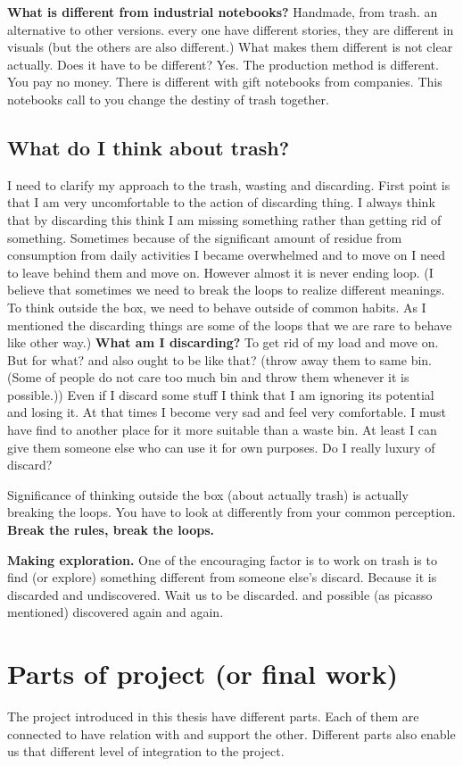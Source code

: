 \textbf{What is different from industrial notebooks?} Handmade, from trash. an alternative to other versions. every one have different stories, they are different in visuals (but the others are also different.) What makes them different is not clear actually. Does it have to be different? Yes. The production method is different. You pay no money. There is different with gift notebooks from companies. This notebooks call to you change the destiny of trash together. 

\subsection{What do I think about trash?}
I need to clarify my approach to the trash, wasting and discarding. First point is that I am very uncomfortable to the action of discarding thing. I always think that by discarding this think I am missing something rather than getting rid of something. Sometimes because of the significant amount of residue from consumption from daily activities I became overwhelmed and to move on I need to leave behind them and move on. However almost it is never ending loop. (I believe that sometimes we need to break the loops to realize different meanings. To think outside the box, we need to behave outside of common habits. As I mentioned the discarding things are some of the loops that we are rare to behave like other way.) \textbf{What am I discarding?} To get rid of my load and move on. But for what? and also ought to be like that? (throw away them to same bin. (Some of people do not care too much bin and throw them whenever it is possible.)) Even if I discard some stuff I think that I am ignoring its potential and losing it. At that times I become very sad and feel very comfortable. I must have find to another place for it more suitable than a waste bin. At least I can give them someone else who can use it for own purposes. Do I really luxury of discard?

Significance of thinking outside the box (about actually trash) is actually breaking the loops. You have to look at differently from your common perception. \textbf{Break the rules, break the loops.}

\textbf{Making exploration.} One of the encouraging factor is to work on trash is to find (or explore) something different from someone else's discard. Because it is discarded and undiscovered. Wait us to be discarded. and possible (as picasso mentioned) discovered again and again. 

\section{Parts of project (or final work)}
The project introduced in this thesis have different parts. Each of them are connected to have relation with and support the other. Different parts also enable us that different level of integration to the project. 

